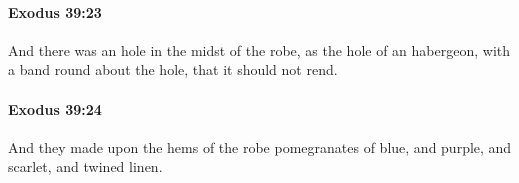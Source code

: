 		\paragraph{Exodus 39:23} %
			\label{EXODUS-39-23}

			And there was an hole in the midst of the robe, as the hole of an habergeon, with a band round about the hole, that it should not rend.


		\paragraph{Exodus 39:24} %
			\label{EXODUS-39-24}

			And they made upon the hems of the robe pomegranates of blue, and purple, and scarlet, and twined linen.


